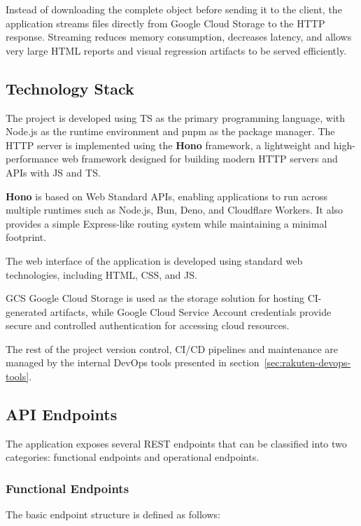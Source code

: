 Instead of downloading the complete object before sending it to the client, the application streams files directly from Google Cloud Storage to the HTTP response. Streaming reduces memory consumption, decreases latency, and allows very large HTML reports and visual regression artifacts to be served efficiently.

\subsection{Technology Stack}

The project is developed using \acs{TS} as the primary programming language, with Node.js as the runtime environment and pnpm as the package manager. The HTTP server is implemented using the \textbf{Hono} framework, a lightweight and high-performance web framework designed for building modern HTTP servers and APIs with \acs{JS} and \acs{TS}.

\textbf{Hono} is based on Web Standard APIs, enabling applications to run across multiple runtimes such as Node.js, Bun, Deno, and Cloudflare Workers. It also provides a simple Express-like routing system while maintaining a minimal footprint.

The web interface of the application is developed using standard web technologies, including \acs{HTML}, \acs{CSS}, and \acs{JS}.
 
\acf{GCS} Google Cloud Storage is used as the storage solution for hosting \ac{CI}-generated artifacts, while Google Cloud Service Account credentials provide secure and controlled authentication for accessing cloud resources.

The rest of the project version control, \ac{CI}/\acs{CD} pipelines and maintenance are managed by the internal DevOps tools presented in section~\ref{sec:rakuten-devops-tools}.

\subsection{\acs{API} Endpoints}

The application exposes several REST endpoints that can be classified into two categories: functional endpoints and operational endpoints.

\subsubsection{Functional Endpoints}

The basic endpoint structure is defined as follows:

